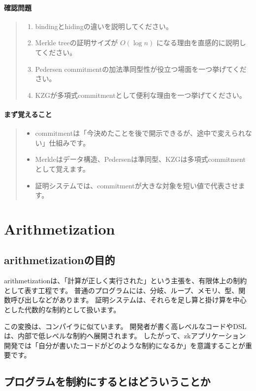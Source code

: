 \documentclass[a4paper,11pt]{ltjsarticle}
\newenvironment{keybox}{%
  \paragraph*{まず覚えること}\begin{quote}
}{%
  \end{quote}
}
\newenvironment{checkpointbox}{%
  \paragraph*{確認問題}\begin{quote}
}{%
  \end{quote}
}
\begin{document}
\begin{checkpointbox}
\begin{enumerate}
  \item bindingとhidingの違いを説明してください。
  \item Merkle treeの証明サイズが \(O(\log n)\) になる理由を直感的に説明してください。
  \item Pedersen commitmentの加法準同型性が役立つ場面を一つ挙げてください。
  \item KZGが多項式commitmentとして便利な理由を一つ挙げてください。
\end{enumerate}
\end{checkpointbox}

\begin{keybox}
\begin{itemize}
  \item commitmentは「今決めたことを後で開示できるが、途中で変えられない」仕組みです。
  \item Merkleはデータ構造、Pedersenは準同型、KZGは多項式commitmentとして覚えます。
  \item 証明システムでは、commitmentが大きな対象を短い値で代表させます。
\end{itemize}
\end{keybox}

\section{Arithmetization}

\subsection{arithmetizationの目的}

arithmetizationは、「計算が正しく実行された」という主張を、有限体上の制約として表す工程です。
普通のプログラムには、分岐、ループ、メモリ、型、関数呼び出しなどがあります。
証明システムは、それらを足し算と掛け算を中心とした代数的な制約として扱います。

この変換は、コンパイラに似ています。
開発者が書く高レベルなコードやDSLは、内部で低レベルな制約へ展開されます。
したがって、zkアプリケーション開発では「自分が書いたコードがどのような制約になるか」を意識することが重要です。

\subsection{プログラムを制約にするとはどういうことか}
\end{document}
